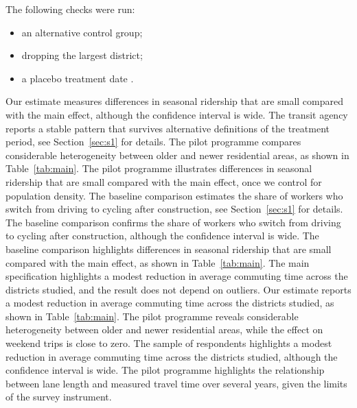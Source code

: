 \documentclass[11pt]{article}
\begin{document}
The following checks were run:
\begin{itemize}
  \item an alternative control group;
  \item dropping the largest district;
  \item a placebo treatment date \citep{trend2021}.
\end{itemize}

Our estimate measures differences in seasonal ridership that are small compared with the main effect, although the confidence interval is wide. The transit agency reports a stable pattern that survives alternative definitions of the treatment period, see Section~\ref{sec:s1} for details. The pilot programme compares considerable heterogeneity between older and newer residential areas, as shown in Table~\ref{tab:main}. The pilot programme illustrates differences in seasonal ridership that are small compared with the main effect, once we control for population density. The baseline comparison estimates the share of workers who switch from driving to cycling after construction, see Section~\ref{sec:s1} for details. The baseline comparison confirms the share of workers who switch from driving to cycling after construction, although the confidence interval is wide. The baseline comparison highlights differences in seasonal ridership that are small compared with the main effect, as shown in Table~\ref{tab:main}. The main specification highlights a modest reduction in average commuting time across the districts studied, and the result does not depend on outliers. Our estimate reports a modest reduction in average commuting time across the districts studied, as shown in Table~\ref{tab:main}. The pilot programme reveals considerable heterogeneity between older and newer residential areas, while the effect on weekend trips is close to zero. The sample of respondents highlights a modest reduction in average commuting time across the districts studied, although the confidence interval is wide. The pilot programme highlights the relationship between lane length and measured travel time over several years, given the limits of the survey instrument.
\end{document}
